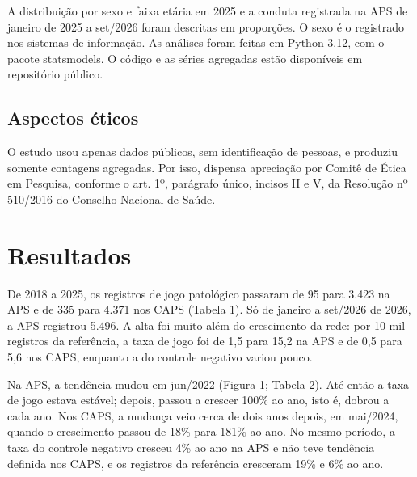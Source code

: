 \documentclass[12pt,a4paper]{article}
\begin{document}
A distribuição por sexo e faixa etária em 2025 e a conduta registrada na APS de janeiro de 2025 a set/2026 foram descritas em proporções. O sexo é o registrado nos sistemas de informação\citep{heidari2016}. As análises foram feitas em Python 3.12, com o pacote statsmodels\citep{seabold2010}. O código e as séries agregadas estão disponíveis em repositório público.

\subsection{Aspectos éticos}

O estudo usou apenas dados públicos, sem identificação de pessoas, e produziu somente contagens agregadas. Por isso, dispensa apreciação por Comitê de Ética em Pesquisa, conforme o art. 1º, parágrafo único, incisos II e V, da Resolução nº 510/2016 do Conselho Nacional de Saúde\citep{res510}.

\section{Resultados}

De 2018 a 2025, os registros de jogo patológico passaram de 95 para 3.423 na APS e de 335 para 4.371 nos CAPS (Tabela 1). Só de janeiro a set/2026 de 2026, a APS registrou 5.496. A alta foi muito além do crescimento da rede: por 10 mil registros da referência, a taxa de jogo foi de 1,5 para 15,2 na APS e de 0,5 para 5,6 nos CAPS, enquanto a do controle negativo variou pouco.



Na APS, a tendência mudou em jun/2022 (Figura 1; Tabela 2). Até então a taxa de jogo estava estável; depois, passou a crescer 100\% ao ano, isto é, dobrou a cada ano. Nos CAPS, a mudança veio cerca de dois anos depois, em mai/2024, quando o crescimento passou de 18\% para 181\% ao ano. No mesmo período, a taxa do controle negativo cresceu 4\% ao ano na APS e não teve tendência definida nos CAPS, e os registros da referência cresceram 19\% e 6\% ao ano.
\end{document}
